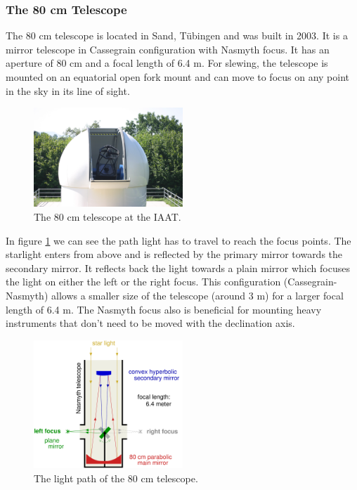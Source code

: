 \documentclass[12pt,a4paper]{article}
\begin{document}
  \subsubsection{The 80 cm Telescope}
    The 80 cm telescope is located in Sand, Tübingen and was built in 2003. It is a mirror telescope in Cassegrain configuration with Nasmyth focus. It has an aperture of 80 cm and 
    a focal length of 6.4 m. For slewing, the telescope is mounted on an equatorial open fork mount and can move to focus on any point in the sky in its line of sight.
    \begin{figure}[H]
      \centering
      \includegraphics[width=0.5\textwidth]{./Pictures/2004_img_0962.jpg}
      \caption{The 80 cm telescope at the IAAT.}
      \label{fig:80cm}
    \end{figure}
    In figure \ref{fig:80cm} we can see the path light has to travel to reach the focus points. The starlight enters from above and is reflected by the primary mirror towards the 
    secondary mirror. It reflects back the light towards a plain mirror which focuses the light on either the left or the right focus. This configuration (Cassegrain-Nasmyth) allows a smaller size of the telescope
    (around 3 m) for a larger focal length of 6.4 m. The Nasmyth focus also is beneficial for mounting heavy instruments that don't need to be moved with the declination axis. 
    \begin{figure}[H]
      \centering
      \includegraphics[width=0.5\textwidth]{Pictures/Nasmyth2.pdf}
      \caption{The light path of the 80 cm telescope.}
      \label{fig:80cm_lp}
    \end{figure}
\end{document}
